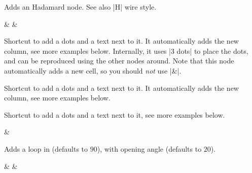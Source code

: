 \documentclass[a4paper,doc2]{ltxdoc} %
\begin{document}
{\begin{command}{\zxH{}}
  Adds an Hadamard node. See also |H| wire style.
\begin{codeexample}[width=3cm]
\begin{ZX}
  \zxNone{} \rar & \zxH{} \rar & \zxNone{}
\end{ZX}
\end{codeexample}
\end{command}



\begin{command}{\leftManyDots{}}
  Shortcut to add a dots and a text next to it. It automatically adds the new column, see more examples below. Internally, it uses |3 dots| to place the dots, and can be reproduced using the other nodes around. Note that this node automatically adds a new cell, so you should \emph{not} use |&|.
\begin{codeexample}[]
\begin{ZX}
   \zxX{\alpha}
\end{ZX}
\end{codeexample}
\end{command}

\begin{command}{\leftManyDots{}}
  Shortcut to add a dots and a text next to it. It automatically adds the new column, see more examples below.
\begin{codeexample}[width=3cm]
\begin{ZX}
  \zxX{\alpha} 
\end{ZX}
\end{codeexample}
\end{command}

\begin{command}{\middleManyDots{}}
  Shortcut to add a dots and a text next to it, see more examples below.
\begin{codeexample}[width=3cm]
\begin{ZX}
  \zxX{\alpha} \middleManyDots{} & \zxX{\beta}
\end{ZX}
\end{codeexample}
\end{command}

\begin{command}{\zxLoop{}}
  Adds a loop in  (defaults to $90$), with opening angle  (defaults to $20$).
\begin{codeexample}[width=3cm]
\begin{ZX}
  \zxX{\alpha} \zxLoop{} & \zxX{} \zxLoop[45]{} & \zxX{} \zxLoop[0][30][red]{}
\end{ZX}
\end{codeexample}
\end{command}

}
\end{document}
